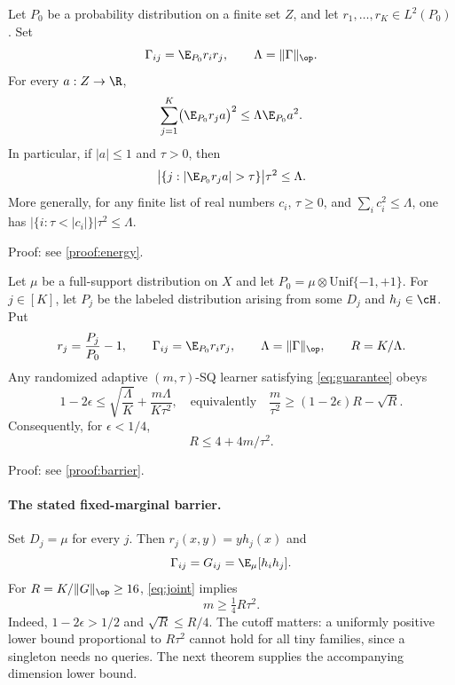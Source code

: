 \begin{lemma}\label{thm:energy}
Let $P_0$ be a probability distribution on a finite set $Z$, and let $r_1,\ldots,r_K\in L^2(P_0)$. Set
\[
 \Gamma_{ij}=\E_{P_0}r_i r_j,\qquad \Lambda=\|\Gamma\|_\op.
\]
For every $a:Z\to\R$,
\begin{equation}\label{eq:energy}
 \sum_{j=1}^K\bigl(\E_{P_0}r_j a\bigr)^2
 \leq\Lambda\E_{P_0}a^2.
\end{equation}
In particular, if $|a|\leq1$ and $\tau>0$, then
\begin{equation}\label{eq:count}
 \bigl|\{j:|\E_{P_0}r_j a|>\tau\}\bigr|\tau^2\leq\Lambda.
\end{equation}
More generally, for any finite list of real numbers $c_i$, $\tau\geq0$, and $\sum_i c_i^2\leq\Lambda$, one has $|\{i:\tau<|c_i|\}|\tau^2\leq\Lambda$.
\end{lemma}

\noindent Proof: see \cref{proof:energy}.\par



\begin{theorem}\label{thm:barrier}
Let $\mu$ be a full-support distribution on $X$ and let $P_0=\mu\otimes\mathrm{Unif}\{-1,+1\}$. For $j\in[K]$, let $P_j$ be the labeled distribution arising from some $D_j$ and $h_j\in\cH$. Put
\[
 r_j=\frac{P_j}{P_0}-1,\qquad
 \Gamma_{ij}=\E_{P_0}r_i r_j,\qquad
 \Lambda=\|\Gamma\|_\op,\qquad R=K/\Lambda.
\]
Any randomized adaptive $(m,\tau)$-SQ learner satisfying \eqref{eq:guarantee} obeys
\begin{equation}\label{eq:joint}
 1-2\epsilon\leq\sqrt{\frac\Lambda K}+
 \frac{m\Lambda}{K\tau^2},
 \quad\text{equivalently}\quad
 \frac m{\tau^2}\geq(1-2\epsilon)R-\sqrt R.
\end{equation}
Consequently, for $\epsilon<1/4$,
\begin{equation}\label{eq:Rbound}
 R\leq4+4m/\tau^2.
\end{equation}
\end{theorem}

\noindent Proof: see \cref{proof:barrier}.\par


\paragraph{The stated fixed-marginal barrier.}
Set $D_j=\mu$ for every $j$. Then $r_j(x,y)=y h_j(x)$ and
\[
 \Gamma_{ij}=G_{ij}=\E_\mu[h_i h_j].
\]
For $R=K/\|G\|_\op\geq16$, \eqref{eq:joint} implies
\begin{equation}\label{eq:fixed}
 m\geq\tfrac14 R\tau^2.
\end{equation}
Indeed, $1-2\epsilon>1/2$ and $\sqrt R\leq R/4$. The cutoff matters: a uniformly positive lower bound proportional to $R\tau^2$ cannot hold for all tiny families, since a singleton needs no queries. The next theorem supplies the accompanying dimension lower bound.

